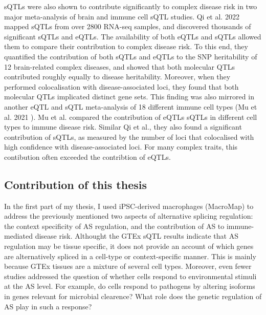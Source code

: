 sQTLs were also shown to contribute significantly to complex disease risk in two major meta-analysis of brain and immune cell sQTL studies. Qi et al. 2022 \cite{Qi2022-iz} mapped sQTLs from over 2800 RNA-seq samples, and discovered thousands of significant sQTLs and eQTLs. The availability of both eQTLs and sQTLs allowed them to compare their contribution to complex disease risk. To this end, they quantified the contribution of both sQTLs and eQTLs to the SNP heritability of 12 brain-related complex diseases, and showed that both molecular QTLs contributed roughly equally to disease heritability. Moreover, when they performed colocalisation with disease-associated loci, they found that both molecular QTLs implicated distinct gene sets. This finding was also mirrored in another eQTL and sQTL meta-analysis of 18 different immune cell types (Mu et al. 2021 \cite{Mu2021-ar}). Mu et al. compared the contribution of eQTLs sQTLs in different cell types to immune disease risk. Similar Qi et al., they also found a significant contribution of sQTLs, as measured by the number of loci that colocalised with high confidence with disease-associated loci. For many complex traits, this contibution often exceeded the contribtion of eQTLs.\\

\subsection{Contribution of this thesis}
In the first part of my thesis, I used iPSC-derived macrophages (MacroMap) to address the previously mentioned two aspects of alternative splicing regulation: the context specificity of AS regulation, and the contribution of AS to immune-mediated disease risk. Althought the GTEx sQTL results indicate that AS regulation may be tissue specific, it does not provide an account of which genes are alternatively spliced in a cell-type or context-specific manner. This is mainly because GTEx tissues are a mixture of several cell types. Moreover, even fewer studies addressed the question of whether cells respond to environmental stimuli at the AS level. For example, do cells respond to pathogens by altering isoforms in genes relevant for microbial clearence? What role does the genetic regulation of AS play in such a response?\\

